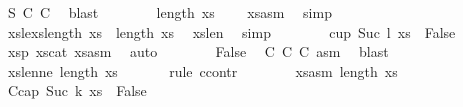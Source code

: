 \begin{isabellebody}
\ S{}{\isacharparenleft}{\kern0pt}{}{\isacharparenright}{\kern0pt}\ C{}\ C{}\ \isamarkupfalse%
\ blast\isanewline
\isanewline
\ \ \ \ \ \ \isamarkupfalse%
\ {\isachardoublequoteopen}length\ xs{}\ {\isacharequal}{\kern0pt}\ {}{\isachardoublequoteclose}\ \isamarkupfalse%
\ xs{}asm\ \isamarkupfalse%
\ simp\isanewline
\ \ \ \ \ \ \isamarkupfalse%
\ xs{}lexs{\isacharcolon}{\kern0pt}{\isachardoublequoteopen}length\ xs{}\ {\isacharequal}{\kern0pt}\ length\ xs{\isachardoublequoteclose}\ \isamarkupfalse%
\ xs{\isacharunderscore}{\kern0pt}len\ \isamarkupfalse%
\ simp\isanewline
\isanewline
\ \ \ \ \ \ \isamarkupfalse%
\ {\isachardoublequoteopen}cup\ {\isacharparenleft}{\kern0pt}Suc\ {\isacharparenleft}{\kern0pt}l{\isacharplus}{\kern0pt}{}{\isacharparenright}{\kern0pt}{\isacharparenright}{\kern0pt}\ xs\ {\isasymLongrightarrow}\ False{\isachardoublequoteclose}\ \isamarkupfalse%
\ xs{}p{}\ xs{\isacharunderscore}{\kern0pt}cat\ xs{}asm\ \isamarkupfalse%
\ auto\isanewline
\ \ \ \ \ \ \isamarkupfalse%
\ False\ \isamarkupfalse%
\ C{}\ C{}\ C{}\ asm{\isacharparenleft}{\kern0pt}{}{\isacharparenright}{\kern0pt}\ \isamarkupfalse%
\ blast\isanewline
\ \ \ \ \isamarkupfalse%
\isanewline
\isanewline
\ \ \ \ \isamarkupfalse%
\ xs{}{\isacharunderscore}{\kern0pt}len{\isacharunderscore}{\kern0pt}ne{\isacharunderscore}{\kern0pt}{}{\isacharcolon}{\kern0pt}\ {\isachardoublequoteopen}length\ xs{}\ {\isasymnoteq}\ {}{\isachardoublequoteclose}\isanewline
\ \ \ \ \isamarkupfalse%
{\isacharparenleft}{\kern0pt}rule\ ccontr{\isacharparenright}{\kern0pt}\isanewline
\ \ \ \ \ \ \isamarkupfalse%
\ xs{}asm{\isacharcolon}{\kern0pt}\ {\isachardoublequoteopen}{\isasymnot}length\ xs{}\ {\isasymnoteq}\ {}{\isachardoublequoteclose}\isanewline
\ \ \ \ \ \ \isamarkupfalse%
\ C{}{\isacharcolon}{\kern0pt}{\isachardoublequoteopen}cap\ {\isacharparenleft}{\kern0pt}Suc\ {\isacharparenleft}{\kern0pt}k{\isacharplus}{\kern0pt}{}{\isacharparenright}{\kern0pt}{\isacharparenright}{\kern0pt}\ xs\ {\isasymLongrightarrow}\ False{\isachardoublequoteclose}\ \isamarkupfalse%

\end{isabellebody}
